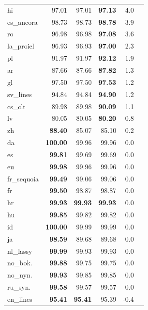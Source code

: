 \documentclass[11pt,a4paper]{article}
\begin{document}
\begin{table}[]
\begin{center}
\begin{tabular}{|l|r||r|r|r|r|}
hi          &      97.01  &     97.01  & \bf 97.13  &      4.0\\
es\_ancora  &      98.73  &     98.73  & \bf 98.78  &      3.9\\
ro          &      96.98  &     96.98  & \bf 97.08  &      3.6\\
la\_proiel  &      96.93  &     96.93  & \bf 97.00  &      2.3\\
pl          &      91.97  &     91.97  & \bf 92.12  &      1.9\\
ar          &      87.66  &     87.66  & \bf 87.82  &      1.3\\
gl          &      97.50  &     97.50  & \bf 97.53  &      1.2\\
sv\_lines   &      94.84  &     94.84  & \bf 94.90  &      1.2\\
cs\_clt     &      89.98  &     89.98  & \bf 90.09  &      1.1\\
lv          &      80.05  &     80.05  & \bf 80.20  &      0.8 \\
zh          & \bf  88.40  &     85.07  &     85.10  &      0.2\\
da          & \bf 100.00  &     99.96  &     99.96  &      0.0\\
es          & \bf  99.81  &     99.69  &     99.69  &      0.0\\
eu          & \bf  99.98  &     99.96  &     99.96  &      0.0\\
fr\_sequoia & \bf  99.49  &     99.06  &     99.06  &      0.0\\
fr          & \bf  99.50  &     98.87  &     98.87  &      0.0\\
hr          & \bf  99.93  & \bf 99.93  & \bf 99.93  &      0.0\\
hu          & \bf  99.85  &     99.82  &     99.82  &      0.0\\
id          & \bf 100.00  &     99.99  &     99.99  &      0.0\\
ja          & \bf  98.59  &     89.68  &     89.68  &      0.0\\
nl\_lassy   & \bf  99.99  &     99.93  &     99.93  &      0.0\\
no\_bok.    & \bf  99.88  &     99.75  &     99.75  &      0.0\\
no\_nyn.    & \bf  99.93  &     99.85  &     99.85  &      0.0\\
ru\_syn.    & \bf  99.58  &     99.57  &     99.57  &      0.0\\
en\_lines   & \bf  95.41  & \bf 95.41  &     95.39  &     -0.4\\

\end{tabular}
\end{center}
\end{table}
\end{document}

